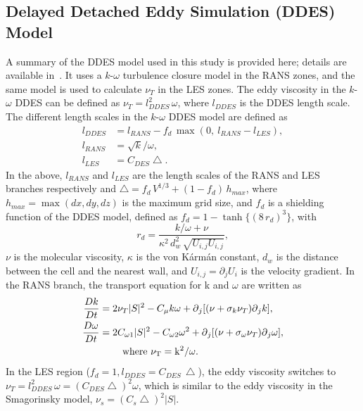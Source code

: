\subsection{Delayed Detached Eddy Simulation (DDES) Model}
\label{sec:DDES}
%
A summary of the DDES model used in this study is provided here; details are
available in~\cite{yin2015dynamic}. It uses a $k$-$\omega$ turbulence closure
model in the RANS zones, and the same model is used to calculate $\nu_T$ in the
LES zones. The eddy viscosity in the $k$-$\omega$ DDES can be defined as
$\nu_T=l_{DDES}^2\, \omega$, where $l_{DDES}$ is the DDES length scale. The
different length scales in the $k$-$\omega$ DDES model are defined as
%
\begin{align}  
  l_{DDES} &=l_{RANS}-f_d\, \max( 0,~l_{RANS}-l_{LES}), \nonumber \\
  l_{RANS} &=\sqrt{k}/\omega, \\
  l_{LES} &=C_{DES}\bigtriangleup. \nonumber
  \label{eq:ddes_lscale}
\end{align}
%
In the above, $l_{RANS}$ and $l_{LES}$ are the length scales of the RANS and LES
branches respectively and $\bigtriangleup = f_d \,V^{1/3}+(1-f_d ) \,h_{max}$,
where $h_{max} = \max(dx,dy,dz)$ is the maximum grid size, and $f_d$ is a
shielding function of the DDES model, defined as $f_d = 1 -
\tanh\{(8\,r_d)^3\}$, with
\[
  r_d=\frac{k/\omega+\nu}{\kappa^2 \, d_w^2 \, \sqrt{U_{i,j} U_{i,j} }},
\]
$\nu$ is the molecular viscosity, $\kappa$ is the von K\'arm\'an constant, $d_w$ is
the distance between the cell and the nearest wall, and $U_{i,j}=\partial_j
U_i$ is the velocity gradient.  In the RANS branch, the transport equation for
k and $\omega$ are written as
%
\begin{align}  
  \frac{Dk}{Dt} & = 2\nu_T |S|^2-C_\mu k\omega+\partial{_j [(\nu+\sigma_k \nu_T ) \partial{_j k}]}, \nonumber \\
  \frac{D\omega}{Dt} & = 2C_{\omega1} |S|^2-C_{\omega2} \omega^2 
                    +\partial{_j [(\nu+\sigma_\omega \nu_T )\partial{_j \omega}]},\\
    &~~~~~~~\rm{where}~\nu_T=k^2/\omega. \nonumber
    \label{eq:transportEqs}
\end{align}  
%
In the LES region ($f_d=1,l_{DDES}=C_{DES} \, \bigtriangleup$), the eddy
viscosity switches to
$\nu_T=l_{DDES}^2\,\omega=(C_{DES}\bigtriangleup)^2\omega$, which is similar to
the eddy viscosity in the Smagorinsky model, $\nu_s=(C_s \bigtriangleup)^2
|S|$.

